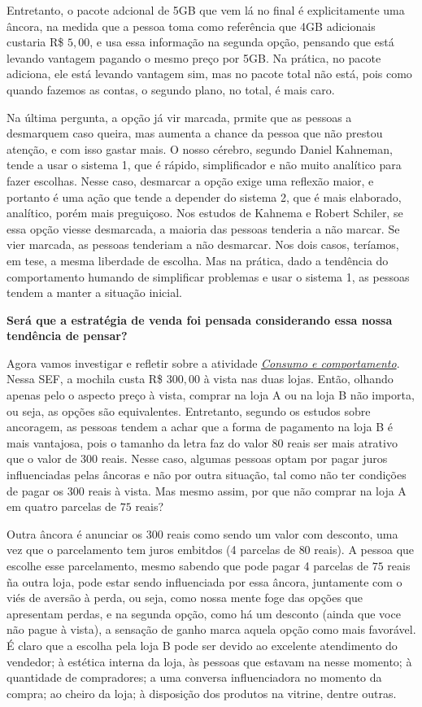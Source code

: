 Entretanto, o pacote adcional de 5GB que vem lá no final é explicitamente uma âncora, na medida que a pessoa toma como referência que 4GB adicionais custaria R\$ $5{,}00$, e usa essa informação na segunda opção, pensando que está levando vantagem pagando o mesmo preço por 5GB. Na prática, no pacote adiciona, ele está levando vantagem sim, mas no pacote total não está, pois como quando fazemos as contas, o segundo plano, no total, é mais caro.

Na última pergunta, a opção já vir marcada, prmite que as pessoas a desmarquem caso queira, mas aumenta a chance da pessoa que não prestou atenção, e com isso gastar mais. O nosso cérebro, segundo Daniel Kahneman, tende a usar o sistema 1, que é rápido, simplificador e não muito analítico para fazer escolhas. Nesse caso, desmarcar a opção exige uma reflexão maior, e portanto é uma ação que tende a depender do sistema 2, que é mais elaborado, analítico, porém mais preguiçoso. Nos estudos de Kahnema e Robert Schiler, se essa opção viesse desmarcada, a maioria das pessoas tenderia a não marcar. Se vier marcada, as pessoas tenderiam a não desmarcar. Nos dois casos, teríamos, em tese, a mesma liberdade de escolha. Mas na prática, dado a tendência do comportamento humando de simplificar problemas e usar o sistema 1, as pessoas tendem a manter a situação inicial.

 \textbf{Será que a estratégia de venda foi pensada considerando essa nossa tendência de pensar?}

Agora vamos investigar e refletir sobre a atividade \hyperref[consumo-comportamento]{\textit{Consumo e comportamento}}. Nessa SEF, a mochila custa R\$ $300{,}00$ à vista nas duas lojas. Então, olhando apenas pelo o aspecto preço à vista, comprar na loja A ou na loja B não importa, ou seja, as opções são equivalentes. Entretanto, segundo os estudos sobre ancoragem, as pessoas tendem a achar que a forma de pagamento na loja B é mais vantajosa, pois o tamanho da letra faz do valor $80$ reais ser mais atrativo que o valor de 300 reais. Nesse caso, algumas pessoas optam por pagar juros influenciadas pelas âncoras e não por outra situação, tal como não ter condições de pagar os 300 reais à vista. Mas mesmo assim, por que não comprar na loja A em quatro parcelas de $75$ reais?

Outra âncora é anunciar os $300$ reais como sendo um valor com desconto, uma vez que o parcelamento tem juros embitdos (4 parcelas de $80$ reais). A pessoa que escolhe esse parcelamento, mesmo sabendo que pode pagar 4 parcelas de $75$ reais ña outra loja, pode estar sendo influenciada por essa âncora, juntamente com o viés de aversão à perda, ou seja, como nossa mente foge das opções que apresentam perdas, e na segunda opção, como há um desconto (ainda que voce não pague à vista), a sensação de ganho marca aquela opção como mais favorável. É claro que a escolha pela loja B pode ser devido ao excelente atendimento do vendedor; à estética interna da loja, às pessoas que estavam na nesse momento; à quantidade de compradores; a uma conversa influenciadora no momento da compra; ao cheiro da loja; à disposição dos produtos na vitrine, dentre outras.

